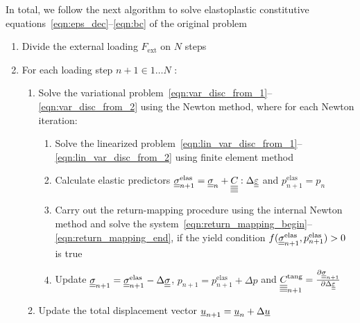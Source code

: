 \documentclass[12pt]{article}
\begin{document}
In total, we follow the next algorithm to solve elastoplastic constitutive equations~\eqref{eqn:eps_dec}--\eqref{eqn:bc} of the original problem
\begin{enumerate}
    \item Divide the external loading $F_\text{ext}$ on $N$ steps 
    \item For each loading step $n+1 \in {1 \dots N}$ :
    \begin{enumerate}
        \item Solve the variational problem~\eqref{eqn:var_disc_from_1}--\eqref{eqn:var_disc_from_2} using the Newton method, where for each Newton iteration:
        \begin{enumerate}
            \item Solve the linearized problem~\eqref{eqn:lin_var_disc_from_1}--\eqref{eqn:lin_var_disc_from_2} using finite element method
            \item Calculate elastic predictors $\underline{\underline{\sigma}}_{n+1}^{\text{elas}} = \underline{\underline{\sigma}}_n + \underline{\underline{\underline{\underline{C_{}}}}} : \Delta\underline{\underline{\varepsilon}}$ and $p_{n+1}^\text{elas} = p_n$
            \item Carry out the return-mapping procedure using the internal Newton method and solve the system~\eqref{eqn:return_mapping_begin}--\eqref{eqn:return_mapping_end}, if the yield condition $f(\underline{\underline{\sigma}}_{n+1}^\text{elas}, p_{n+1}^\text{elas}) > 0$ is true
            \item Update $\underline{\underline{\sigma}}_{n+1} = \underline{\underline{\sigma}}_{n+1}^{\text{elas}} - \Delta\underline{\underline{\sigma}}$, $p_{n+1} = p_{n+1}^\text{elas} + \Delta p$ and $\underline{\underline{\underline{\underline{C_{}}}}}^\text{tang}_{n+1} = \frac{\partial \underline{\underline{\sigma}}_{n+1}}{\partial\Delta\underline{\underline{\varepsilon}}}$
        \end{enumerate}
        \item Update the total displacement vector $\underline{u}_{n+1} = \underline{u}_n + \Delta\underline{u}$
    \end{enumerate}
\end{enumerate}
\end{document}

